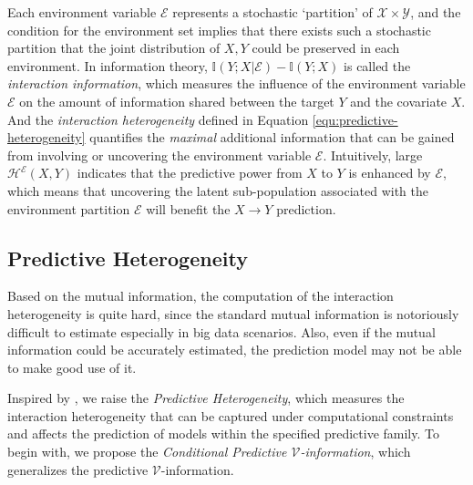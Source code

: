 Each environment variable $\mathcal E$ represents a stochastic `partition' of $\mathcal X \times \mathcal Y$, and the condition for the environment set implies that there exists such a stochastic partition that the joint distribution of $X,Y$ could be preserved in each environment.
In information theory, $\mathbb{I}(Y;X|\mathcal{E})-\mathbb{I}(Y;X)$ is called the \emph{interaction information}, which measures the influence of the environment variable $\mathcal{E}$ on the amount of information shared between the target $Y$ and the covariate $X$.
And the \emph{interaction heterogeneity} defined in Equation \ref{equ:predictive-heterogeneity} quantifies the \emph{maximal} additional information that can be gained from involving or uncovering the environment variable $\mathcal{E}$.
Intuitively, large $\mathcal{H}^{\mathscr{E}}(X,Y)$ indicates that the predictive power from $X$ to $Y$ is enhanced by $\mathcal{E}$, which means that uncovering the latent sub-population associated with the environment partition $\mathcal{E}$ will benefit the $X\rightarrow Y$ prediction.



\subsection{Predictive Heterogeneity}
Based on the mutual information, the computation of the interaction heterogeneity is quite hard, since the standard mutual information is notoriously difficult to estimate especially in big data scenarios.
Also, even if the mutual information could be accurately estimated, the prediction model may not be able to make good use of it.

Inspired by \cite{DBLP:conf/iclr/XuZSSE20}, we raise the \emph{Predictive Heterogeneity}, which measures the interaction heterogeneity that can be captured under computational constraints and affects the prediction of models within the specified predictive family.
To begin with, we propose the \emph{Conditional Predictive $\mathcal V$-information}, which generalizes the predictive $\mathcal V$-information.


